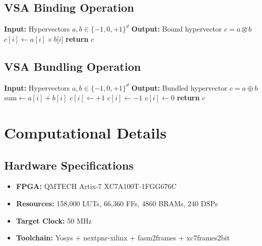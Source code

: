 \documentclass[aps,prd,preprint,superscriptaddress,showpacs,nofootinbib,longbibliography]{revtex4-2}
\begin{document}
\subsection{VSA Binding Operation}

\begin{algorithmic}[1]
\State \textbf{Input:} Hypervectors $a, b \in \{-1, 0, +1\}^d$
\State \textbf{Output:} Bound hypervector $c = a \otimes b$
\State
{}
    \State $c[i] \gets a[i] \times b[i$]  
\EndFor
\State \textbf{return} $c$
\end{algorithmic}

\subsection{VSA Bundling Operation}

\begin{algorithmic}[1]
\State \textbf{Input:} Hypervectors $a, b \in \{-1, 0, +1\}^d$
\State \textbf{Output:} Bundled hypervector $c = a \oplus b$
\State
{}
    \State $\text{sum} \gets a[i] + b[i]$
        \State $c[i] \gets +1$
        \State $c[i] \gets -1$
    \Else
        \State $c[i] \gets 0$
    \EndIf
\EndFor
\State \textbf{return} $c$
\end{algorithmic}

\section{Computational Details}
\label{app:computational}

\subsection{Hardware Specifications}

\begin{itemize}
    \item \textbf{FPGA:} QMTECH Artix-7 XC7A100T-1FGG676C
    \item \textbf{Resources:} 158,000 LUTs, 66,360 FFs, 4860 BRAMs, 240 DSPs
    \item \textbf{Target Clock:} 50 MHz
    \item \textbf{Toolchain:} Yosys + nextpnr-xilinx + fasm2frames + xc7frames2bit
\end{itemize}
\end{document}
